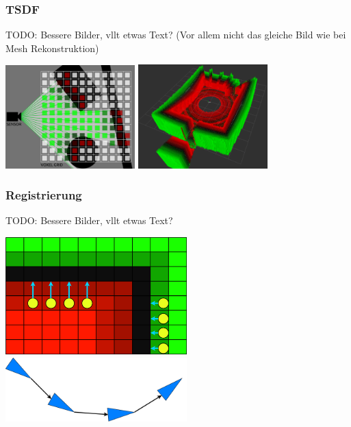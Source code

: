 \documentclass{beamer}
\begin{document}
\subsubsection*{TSDF}
\begin{frame}{\subsubsecname}
TODO: Bessere Bilder, vllt etwas Text?
(Vor allem nicht das gleiche Bild wie bei Mesh Rekonstruktion)
\begin{center}
\includegraphics[width=5cm]{images/TSDF_Gen_new.png}
\includegraphics[width=5cm]{images/TSDF_3D.png}
\end{center}
\end{frame}

\subsubsection*{Registrierung}
\begin{frame}{\subsubsecname}
TODO: Bessere Bilder, vllt etwas Text?
\begin{center}
\includegraphics[width=7cm]{images/Reg_Gradient.png}
\includegraphics[width=7cm]{images/Pose_Graph.png}
\end{center}
\end{frame}
\end{document}
